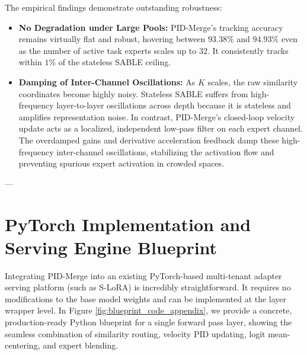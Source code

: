 The empirical findings demonstrate outstanding robustness:
\begin{itemize}
    \item \textbf{No Degradation under Large Pools:} PID-Merge's tracking accuracy remains virtually flat and robust, hovering between $93.38\%$ and $94.93\%$ even as the number of active task experts scales up to 32. It consistently tracks within $1\%$ of the stateless SABLE ceiling.
    \item \textbf{Damping of Inter-Channel Oscillations:} As $K$ scales, the raw similarity coordinates become highly noisy. Stateless SABLE suffers from high-frequency layer-to-layer oscillations across depth because it is stateless and amplifies representation noise. In contrast, PID-Merge's closed-loop velocity update acts as a localized, independent low-pass filter on each expert channel. The overdamped gains and derivative acceleration feedback damp these high-frequency inter-channel oscillations, stabilizing the activation flow and preventing spurious expert activation in crowded spaces.
\end{itemize}

---

\section{PyTorch Implementation and Serving Engine Blueprint}
\label{sec:appendix_blueprint}

Integrating PID-Merge into an existing PyTorch-based multi-tenant adapter serving platform (such as S-LoRA) is incredibly straightforward. It requires no modifications to the base model weights and can be implemented at the layer wrapper level. In Figure \ref{fig:blueprint_code_appendix}, we provide a concrete, production-ready Python blueprint for a single forward pass layer, showing the seamless combination of similarity routing, velocity PID updating, logit mean-centering, and expert blending.

